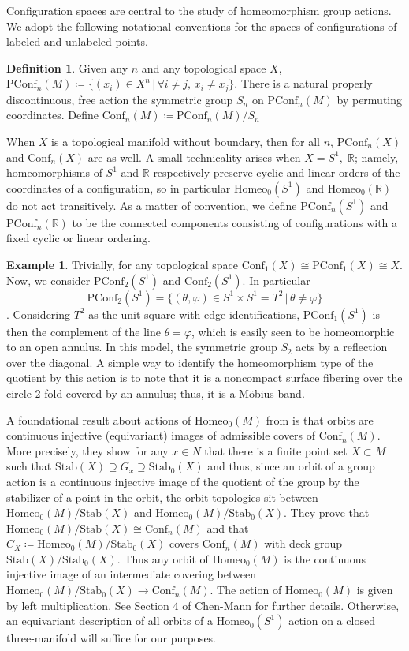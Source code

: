 \documentclass[10pt, oneside]{article}
\newcommand{\R}{\mathbb{R}}
\newcommand{\homeo}[1][S^1]{\text{Homeo}_0(#1)}
\newcommand{\conf}[2][S^1]{\text{Conf}_{#2}(#1)}
\newcommand{\pconf}[2][S^1]{\text{PConf}_{#2}(#1)}
\newcommand{\stab}[1]{\text{Stab}(#1)}
\newcommand{\pstab}[1]{\text{Stab}_0(#1)}
\theoremstyle{definition}
\newtheorem{defn}{Definition}[section]
\newtheorem{eg}{Example}[section]
\theoremstyle{definition}
\begin{document}
Configuration spaces are central to the study of homeomorphism group actions. We adopt the following notational conventions for the spaces of configurations of labeled and unlabeled points.

\begin{defn}
    Given any $n$ and any topological space $X$, $\pconf[M]{n} \coloneqq \{(x_i)\in X^n \,\vert\, \forall i\neq j,\, x_i\neq x_j\}$.
    There is a natural properly discontinuous, free action the symmetric group $S_n$ on $\pconf[M]{n}$ by permuting coordinates. Define $\conf[M]{n}\coloneqq \pconf[M]{n}/S_n$
\end{defn}

When $X$ is a topological manifold without boundary, then for all $n$, $\pconf[X]{n}$ and $\conf[X]{n}$ are as well. A small technicality arises when $X=S^1,\; \R$; namely, homeomorphisms of $S^1$ and $\R$ respectively preserve cyclic and linear orders of the coordinates of a configuration, so in particular $\homeo$ and $\homeo[\R]$ do not act transitively. As a matter of convention, we define $\pconf[S^1]{n}$ and $\pconf[\R]{n}$ to be the connected components consisting of configurations with a fixed cyclic or linear ordering. 

\begin{eg}\label{eg:confcompute}
    Trivially, for any topological space $\conf[X]{1}\cong\pconf[X]{1}\cong X$. Now, we consider $\pconf[S^1]{2}$ and $\conf[S^1]{2}$. In particular
    $$\pconf[S^1]{2} = \{(\theta, \varphi)\in S^1\times S^1 = T^2\,\vert\, \theta\neq\varphi\}$$. Considering $T^2$ as the unit square with edge identifications, $\pconf[S^1]{1}$ is then the complement of the line $\theta=\varphi$, which is easily seen to be homeomorphic to an open annulus. In this model, the symmetric group $S_2$ acts by a reflection over the diagonal. A simple way to identify the homeomorphism type of the quotient by this action is to note that it is a noncompact surface fibering over the circle 2-fold covered by an annulus; thus, it is a M\"{o}bius band\cite{morton:SymmetricProducts}.
\end{eg}

A foundational result about actions of $\homeo[M]$ from \cite{chen:StructureTheorems} is that orbits are continuous injective (equivariant) images of admissible covers of $\conf[M]{n}$. More precisely, they show for any $x\in N$ that there is a finite point set $X\subset M$ such that $\stab{X}\supseteq G_x \supseteq \pstab{X}$ and thus, since an orbit of a group action is a continuous injective image of the quotient of the group by the stabilizer of a point in the orbit, the orbit topologies sit between $\homeo[M]/\stab{X}$ and $\homeo[M]/\pstab{X}$. They prove that $\homeo[M]/\stab{X}\cong \conf[M]{n}$ and that $C_X\coloneqq \homeo[M]/\pstab{X}$ covers $\conf[M]{n}$ with deck group $\stab{X}/\pstab{X}$. Thus any orbit of $\homeo[M]$ is the continuous injective image of an intermediate covering between $\homeo[M]/\pstab{X}\to \conf[M]{n}$. The action of $\homeo[M]$ is given by left multiplication. See Section 4 of Chen-Mann\cite{chen:StructureTheorems} for further details. Otherwise, an equivariant description of all orbits of a $\homeo$ action on a closed three-manifold will suffice for our purposes.
\end{document}
